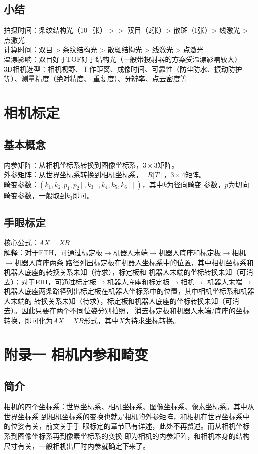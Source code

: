 \documentclass[11pt]{article}
\begin{document}
\subsection{小结}
拍摄时间：条纹结构光（10+张）$>>$ 双目（2张）> 散斑（1张）> 线激光 > 点激光  \\
计算时间：双目 > 条纹结构光 > 散斑结构光 > 线激光 > 点激光  \\
温漂影响：双目好于TOF好于结构光（一般带投射器的方案受温漂影响较大）  \\
3D相机选型：相机视野、工作距离、成像时间、可靠性（防尘防水、振动防护等）、测量精度（绝对精度、
重复度）、分辨率、点云密度等


\section{相机标定}

\subsection{基本概念}
内参矩阵：从相机坐标系转换到图像坐标系，$3 \times 3$矩阵。  \\
外参矩阵：从世界坐标系转换到相机坐标系，$[R|T]$，$3 \times 4$矩阵。  \\
畸变参数：$(k_{1},k_{2},p_{1},p_{2}[,k_{3}[,k_{4},k_{5},k_{6}]])$，其中$k$为径向畸变
参数，$p$为切向畸变参数，一般取到$k_{3}$即可。

\subsection{手眼标定}
核心公式：$AX=XB$  \\
解释：对于ETH，可通过标定板$\to$机器人末端$\to$机器人底座和标定板$\to$相机$\to$机器人底座两条
路径列出标定板在机器人坐标系中的位置，其中相机坐标系和机器人底座的转换关系未知（待求），标定板和
机器人末端的坐标转换未知（可消去）；对于EIH，可通过标定板$\to$机器人底座和标定板$\to$相机$\to$
机器人末端$\to$机器人底座两条路径列出标定板在机器人坐标系中的位置，其中相机坐标系和机器人末端的
转换关系未知（待求），标定板和机器人底座的坐标转换未知（可消去）。因此只要在两个不同位姿分别拍照，
消去标定板和机器人末端/底座的坐标转换，即可化为$AX=XB$形式，其中$X$为待求坐标转换。

\section{附录一 \quad 相机内参和畸变}

\subsection{简介}
相机的四个坐标系：世界坐标系、相机坐标系、图像坐标系、像素坐标系。其中从世界坐标系
到相机坐标系的变换也就是相机的外参矩阵，和相机在世界坐标系中的位姿有关，前文关于手
眼标定的章节已有详述，此处不再赘述。而从相机坐标系到图像坐标系再到像素坐标系的变换
即为相机的内参矩阵，和相机本身的结构尺寸有关，一般相机出厂时内参就确定下来了。
\end{document}
